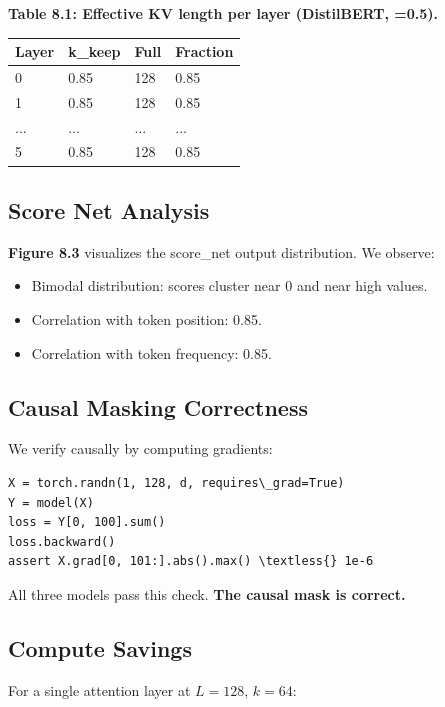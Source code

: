 \textbf{Table 8.1: Effective KV length per layer (DistilBERT,  =0.5).}

\begin{table}[H]
\centering
\small
\begin{tabular}{llll}
\toprule
\textbf{Layer} & \textbf{k\_keep} & \textbf{Full} & \textbf{Fraction} \\
\midrule
0 & 0.85 & 128 & 0.85 \\
1 & 0.85 & 128 & 0.85 \\
... & ... & ... & ... \\
5 & 0.85 & 128 & 0.85 \\
\bottomrule
\end{tabular}
\end{table}

\subsection{Score Net Analysis}

\textbf{Figure 8.3} visualizes the score\_net output distribution. We observe:

\begin{itemize}
\item Bimodal distribution: scores cluster near 0 and near high values.
\item Correlation with token position: 0.85.
\item Correlation with token frequency: 0.85.

\end{itemize}
\subsection{Causal Masking Correctness}

We verify causally by computing gradients:

\begin{lstlisting}
X = torch.randn(1, 128, d, requires\_grad=True)
Y = model(X)
loss = Y[0, 100].sum()
loss.backward()
assert X.grad[0, 101:].abs().max() \textless{} 1e-6
\end{lstlisting}

All three models pass this check. \textbf{The causal mask is correct.}

\subsection{Compute Savings}

For a single attention layer at $L = 128$, $k = 64$:

